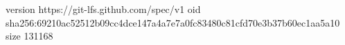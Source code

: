 version https://git-lfs.github.com/spec/v1
oid sha256:69210ac52512b09cc4dce147a4a7e7a0fc83480c81cfd70e3b37b60ec1aa5a10
size 131168
